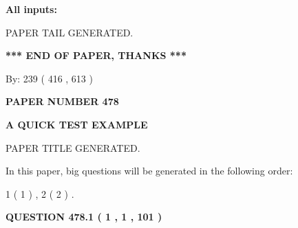 \documentclass[12pt]{article}
\begin{document}
   
   
   
\noindent{}
   
   
   
   
\noindent\vspace{0.1in}\hspace{-0.08in} {\textbf{\Large{All inputs: }}}
   
   
   
   
   
   
 \vspace{0.2in}
 
   
   
\vspace{2.0in} PAPER TAIL GENERATED.
   
   
   
   
\vspace{1.0in} 
{\textbf{\large{ *** END OF PAPER, THANKS *** }}} 
   
   
\hspace{1.0in} By: 
 239 ( 416 ,  613 )
   
   
   
   
\newpage 
\setcounter{page}{ 
   478001 } 
   
   
   
   
 {\textbf{ \Large{ PAPER NUMBER  478  }}}
   
   
\vspace{0.2in}
   
   
   
   
   
   
   
   
 \vspace{0.2in}
{\LARGE {\textbf{ A QUICK TEST EXAMPLE}}}
   
   
 PAPER TITLE GENERATED.
   
   
   
\vspace{0.2in}
   
In this paper, big questions will be generated in the following order: 
   
   
   1 ( 1 )
 ,
   2 ( 2 )
 .
  
\vspace{0.2in}
  
{\textbf{\Large{QUESTION
478.1 
 ( 1 , 1 , 101 )
}}}
  
  
 
\end{document}
